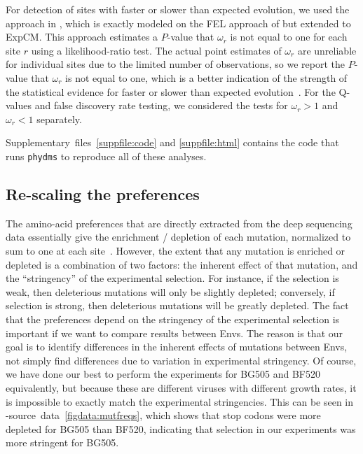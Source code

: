 \documentclass[9pt]{elife}
\begin{document}
For detection of sites with faster or slower than expected evolution, we used the approach in \citet{bloom2017identification}, which is exactly modeled on the FEL approach of \citet{kosakovsky2005not} but extended to ExpCM.
This approach estimates a $P$-value that $\omega_r$ is not equal to one for each site $r$ using a likelihood-ratio test.
The actual point estimates of $\omega_r$ are unreliable for individual sites due to the limited number of observations, so we report the $P$-value that $\omega_r$ is not equal to one, which is a better indication of the strength of the statistical evidence for faster or slower than expected evolution~\citep{kosakovsky2005not,murrell2012detecting}.
For the Q-values and false discovery rate testing, we considered the tests for $\omega_r > 1$ and $\omega_r < 1$ separately.

Supplementary~files~\ref{suppfile:code} and \ref{suppfile:html} contains the code that runs \texttt{phydms} to reproduce all of these analyses.

\subsection{Re-scaling the preferences}
The amino-acid preferences that are directly extracted from the deep sequencing data essentially give the enrichment / depletion of each mutation, normalized to sum to one at each site~\cite[][\url{https://jbloomlab.github.io/dms_tools2/prefs.html}]{bloom2015software}.
However, the extent that any mutation is enriched or depleted is a combination of two factors: the inherent effect of that mutation, and the ``stringency'' of the experimental selection.
For instance, if the selection is weak, then deleterious mutations will only be slightly depleted; conversely, if selection is strong, then deleterious mutations will be greatly depleted.
The fact that the preferences depend on the stringency of the experimental selection is important if we want to compare results between Envs.
The reason is that our goal is to identify differences in the inherent effects of mutations between Envs, not simply find differences due to variation in experimental stringency.
Of course, we have done our best to perform the experiments for BG505 and BF520 equivalently, but because these are different viruses with different growth rates, it is impossible to exactly match the experimental stringencies.
This can be seen in -source~data~\ref{figdata:mutfreqs}, which shows that stop codons were more depleted for BG505 than BF520, indicating that selection in our experiments was more stringent for BG505.
\end{document}
